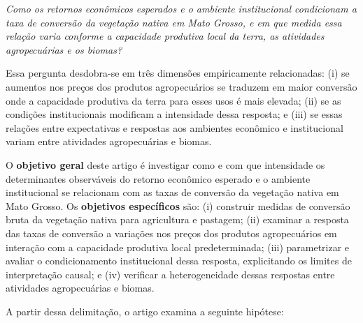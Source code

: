 \medskip

\noindent\emph{Como os retornos econômicos esperados e o ambiente institucional condicionam a taxa de conversão da vegetação nativa em Mato Grosso, e em que medida essa relação varia conforme a capacidade produtiva local da terra, as atividades agropecuárias e os biomas?}

\medskip

Essa pergunta desdobra-se em três dimensões empiricamente relacionadas: (i) se aumentos nos preços dos produtos agropecuários se traduzem em maior conversão onde a capacidade produtiva da terra para esses usos é mais elevada; (ii) se as condições institucionais modificam a intensidade dessa resposta; e (iii) se essas relações entre expectativas e respostas aos ambientes econômico e institucional variam entre atividades agropecuárias e biomas. 

O \textbf{objetivo geral} deste artigo é investigar como e com que intensidade os determinantes observáveis do retorno econômico esperado e o ambiente institucional se relacionam com as taxas de conversão da vegetação nativa em Mato Grosso. Os \textbf{objetivos específicos} são: (i) construir medidas de conversão bruta da vegetação nativa para agricultura e pastagem; (ii) examinar a resposta das taxas de conversão a variações nos preços dos produtos agropecuários em interação com a capacidade produtiva local predeterminada; (iii) parametrizar e avaliar o condicionamento institucional dessa resposta, explicitando os limites de interpretação causal; e (iv) verificar a heterogeneidade dessas respostas entre atividades agropecuárias e biomas.



A partir dessa delimitação, o artigo examina a seguinte hipótese:

